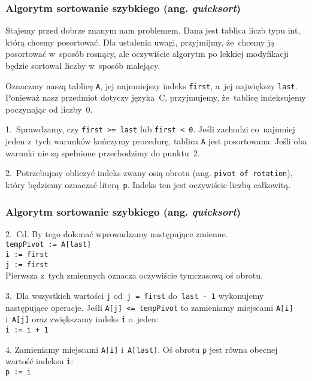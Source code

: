 \documentclass[10pt,t]{beamer}
\begin{document}
\begin{frame}
  \frametitle{Algorytm sortowanie szybkiego (ang.
    \textit{quicksort})}


  Stajemy przed dobrze znanym nam problemem. Dana jest tablica liczb typu
  int, którą chcemy posortować. Dla ustalenia uwagi, przyjmijmy, że~chcemy
  ją posortować w~sposób rosnący, ale oczywiście algorytm po lekkiej
  modyfikacji będzie sortował liczby w~sposób malejący.

  Oznaczmy naszą tablicę \texttt{A}, jej najmniejszy indeks \texttt{first},
  a~jej największy \texttt{last}. Ponieważ nasz przedmiot dotyczy języka~C,
  przyjmujemy, że~tablicę indeksujemy poczynając od liczby~$0$.

  1.~Sprawdzamy, czy \texttt{first >= last} lub \texttt{first < 0}. Jeśli
  zachodzi co~najmniej jeden z~tych warunków kończymy procedurę, tablica
  \texttt{A} jest posortowana. Jeśli oba warunki nie są spełnione
  przechodzimy do punktu~$2$.

  2.~Potrzebujmy obliczyć indeks zwany osią obrotu (ang. \texttt{pivot~of
    rotation}), który będziemy oznaczać literą~\texttt{p}. Indeks ten jest
  oczywiście liczbą całkowitą.

\end{frame}





\begin{frame}
  \frametitle{Algorytm sortowanie szybkiego (ang.
    \textit{quicksort})}


  2.~Cd. By tego dokonać wprowadzamy następujące zmienne. \\
  \texttt{tempPivot := A[last]} \\
  \texttt{i := first} \\
  \texttt{j := first} \\
  Pierwsza z~tych zmiennych oznacza oczywiście tymczasową oś obrotu.

  3.~Dla wszystkich wartości \texttt{j} od~\texttt{j = first}
  do~\texttt{last - 1} wykonujemy następujące operacje. Jeśli
  \texttt{A[j] <= tempPivot} to zamieniamy miejscami \texttt{A[i]}
  i~\texttt{A[j]} oraz zwiększamy indeks \texttt{i} o~jeden: \\
  \texttt{i := i + 1}

  4. Zamieniamy miejscami \texttt{A[i]} i~\texttt{A[last]}. Oś obrotu
  \texttt{p} jest równa obecnej wartość indeksu \texttt{i}: \\
  \texttt{p := i}

\end{frame}
\end{document}
